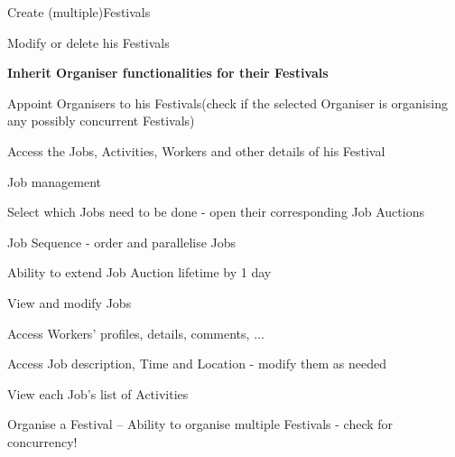 \begin{packed_enum}
\begin{packed_enum}
				\end{packed_enum}
				
				\item	{}
				\begin{packed_enum}
					\item Create (multiple)Festivals
					\item Modify or delete his Festivals	
					\item \textbf{Inherit Organiser functionalities for their Festivals}
					\item Appoint Organisers to his Festivals(check if the selected Organiser is organising any possibly concurrent Festivals)
					\item Access the Jobs, Activities, Workers and other details of his Festival
				\end{packed_enum}
				
				\item	{}
				\begin{packed_enum}
					\item Job management
					\begin{packed_enum}
						\item Select which Jobs need to be done - open their corresponding Job Auctions
						\item Job Sequence - order and parallelise Jobs
						\item Ability to extend Job Auction lifetime by 1 day
						\item View and modify Jobs
						\begin{packed_enum}
							\item Access Workers' profiles, details, comments, ...
							\item Access Job description, Time and Location - modify them as needed
							\item View each Job's list of Activities
						\end{packed_enum}
					\end{packed_enum}
					
					\item Organise a Festival -- Ability to organise multiple Festivals - check for concurrency!
				\end{packed_enum}
				

\end{packed_enum}

